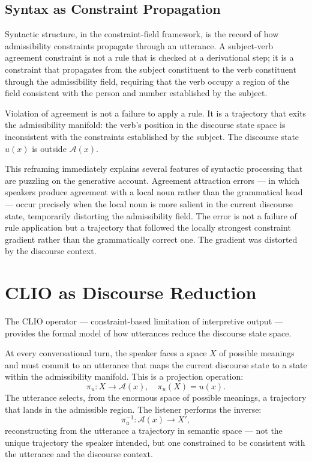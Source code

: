 \documentclass[11pt, a4paper]{article}
\theoremstyle{definition}
\theoremstyle{remark}
\begin{document}
\subsection{Syntax as Constraint Propagation}

Syntactic structure, in the constraint-field framework, is the record of how
admissibility constraints propagate through an utterance. A subject-verb
agreement constraint is not a rule that is checked at a derivational step;
it is a constraint that propagates from the subject constituent to the verb
constituent through the admissibility field, requiring that the verb occupy
a region of the field consistent with the person and number established by
the subject.

Violation of agreement is not a failure to apply a rule. It is a trajectory
that exits the admissibility manifold: the verb's position in the discourse
state space is inconsistent with the constraints established by the subject.
The discourse state $u(x)$ is outside $\mathcal{A}(x)$.

This reframing immediately explains several features of syntactic processing
that are puzzling on the generative account. Agreement attraction errors ---
in which speakers produce agreement with a local noun rather than the
grammatical head --- occur precisely when the local noun is more salient in
the current discourse state, temporarily distorting the admissibility field.
The error is not a failure of rule application but a trajectory that followed
the locally strongest constraint gradient rather than the grammatically
correct one. The gradient was distorted by the discourse context.

\section{CLIO as Discourse Reduction}

The CLIO operator --- constraint-based limitation of interpretive output ---
provides the formal model of how utterances reduce the discourse state space.

At every conversational turn, the speaker faces a space $X$ of possible
meanings and must commit to an utterance that maps the current discourse
state to a state within the admissibility manifold. This is a projection
operation:
\[
\pi_u: X \to \mathcal{A}(x), \quad \pi_u(X) = u(x).
\]
The utterance selects, from the enormous space of possible meanings, a
trajectory that lands in the admissible region. The listener performs the
inverse:
\[
\pi_u^{-1}: \mathcal{A}(x) \to X',
\]
reconstructing from the utterance a trajectory in semantic space --- not the
unique trajectory the speaker intended, but one constrained to be consistent
with the utterance and the discourse context.
\end{document}
